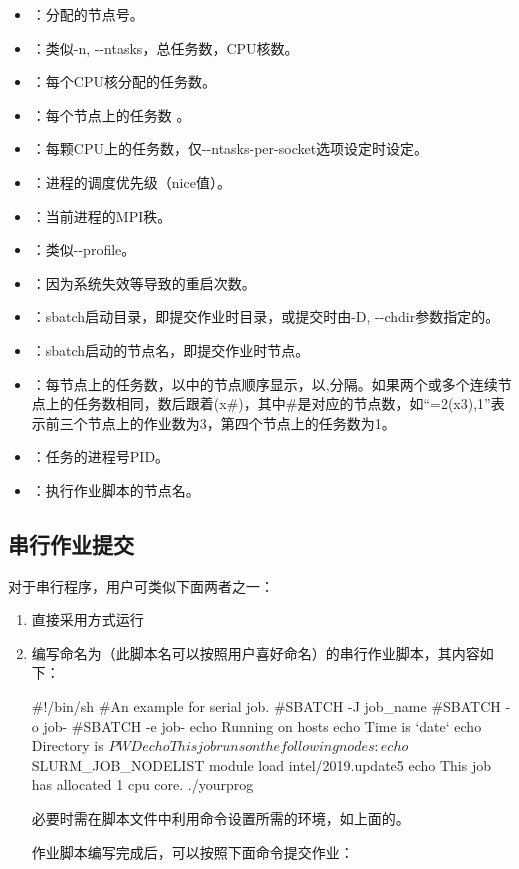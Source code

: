 \begin{itemize}
      \item {}：分配的节点号。
      \item {}：类似-n, -{}-ntasks，总任务数，CPU核数。
      \item {}：每个CPU核分配的任务数。
      \item {}：每个节点上的任务数 。
      \item {}：每颗CPU上的任务数，仅-{}-ntasks-per-socket选项设定时设定。
      \item {}：进程的调度优先级（nice值）。
      \item {}：当前进程的MPI秩。
      \item {}：类似-{}-profile。
      \item {}：因为系统失效等导致的重启次数。
      \item {}：sbatch启动目录，即提交作业时目录，或提交时由-D, -{}-chdir参数指定的。
      \item {}：sbatch启动的节点名，即提交作业时节点。
      \item {}：每节点上的任务数，以中的节点顺序显示，以,分隔。如果两个或多个连续节点上的任务数相同，数后跟着(x\#)，其中\#是对应的节点数，如``=2(x3),1''表示前三个节点上的作业数为3，第四个节点上的任务数为1。
      \item {}：任务的进程号PID。
      \item {}：执行作业脚本的节点名。
\end{itemize}

\subsection{串行作业提交}
对于串行程序，用户可类似下面两者之一：
\begin{enumerate}
	\item 直接采用方式运行
	\item 编写命名为（此脚本名可以按照用户喜好命名）的串行作业脚本，其内容如下：
\begin{SH}
#!/bin/sh
#An example for serial job.
#SBATCH -J job_name
#SBATCH -o job-%
#SBATCH -e job-%
echo Running on hosts 
echo Time is `date`
echo Directory is $PWD
echo This job runs on the following nodes:
echo $SLURM_JOB_NODELIST
module load intel/2019.update5
echo This job has allocated 1 cpu core.
./yourprog
\end{SH}
必要时需在脚本文件中利用命令设置所需的环境，如上面的。

作业脚本编写完成后，可以按照下面命令提交作业：

\end{enumerate}

